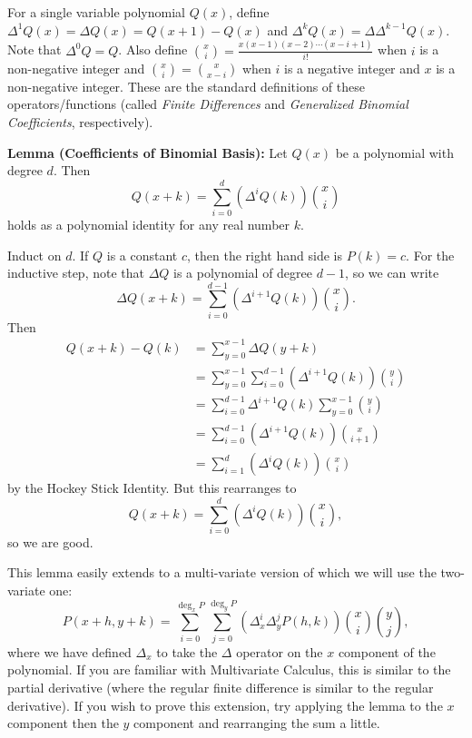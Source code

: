 For a single variable polynomial $Q\left(x\right)$, define $\Delta^1Q\left(x\right)=\Delta Q\left(x\right)=Q\left(x+1\right)-Q\left(x\right)$ and $\Delta^kQ\left(x\right)=\Delta\Delta^{k-1}Q\left(x\right)$. Note that $\Delta^0Q=Q$. Also define $\binom{x}{i}=\frac{x\left(x-1\right)\left(x-2\right)\cdots\left(x-i+1\right)}{i!}$ when $i$ is a non-negative integer and $\binom{x}{i}=\binom{x}{x-i}$ when $i$ is a negative integer and $x$ is a non-negative integer. These are the standard definitions of these operators/functions (called \emph{Finite Differences} and \emph{Generalized Binomial Coefficients}, respectively).

\textbf{Lemma (Coefficients of Binomial Basis):} Let $Q\left(x\right)$ be a polynomial with degree $d$. Then \[Q\left(x+k\right)=\displaystyle\sum_{i=0}^d\left(\Delta^iQ\left(k\right)\right)\binom{x}{i}\] holds as a polynomial identity for any real number $k$.

\begin{lemmaproof}
Induct on $d$. If $Q$ is a constant $c$, then the right hand side is $P\left(k\right)=c$. For the inductive step, note that $\Delta Q$ is a polynomial of degree $d-1$, so we can write \[\Delta Q\left(x+k\right)=\displaystyle\sum_{i=0}^{d-1}\left(\Delta^{i+1}Q\left(k\right)\right)\binom{x}{i}.\] Then \begin{align*}Q\left(x+k\right)-Q\left(k\right)&=\displaystyle\sum_{y=0}^{x-1}\Delta Q\left(y+k\right)\\&=\displaystyle\sum_{y=0}^{x-1}\displaystyle\sum_{i=0}^{d-1}\left(\Delta^{i+1}Q\left(k\right)\right)\binom{y}{i}\\&=\displaystyle\sum_{i=0}^{d-1}\Delta^{i+1}Q\left(k\right)\displaystyle\sum_{y=0}^{x-1}\binom{y}{i}\\&=\displaystyle\sum_{i=0}^{d-1}\left(\Delta^{i+1}Q\left(k\right)\right)\binom{x}{i+1}\\&=\displaystyle\sum_{i=1}^d\left(\Delta^iQ\left(k\right)\right)\binom{x}{i}\end{align*} by the Hockey Stick Identity. But this rearranges to \[Q\left(x+k\right)=\displaystyle\sum_{i=0}^d\left(\Delta^iQ\left(k\right)\right)\binom{x}{i},\] so we are good.
\end{lemmaproof}

This lemma easily extends to a multi-variate version of which we will use the two-variate one: \[P\left(x+h,y+k\right)=\displaystyle\sum_{i=0}^{\deg_xP}\displaystyle\sum_{j=0}^{\deg_yP}\left(\Delta_x^i\Delta_y^jP\left(h,k\right)\right)\binom{x}{i}\binom{y}{j},\] where we have defined $\Delta_x$ to take the $\Delta$ operator on the $x$ component of the polynomial. If you are familiar with Multivariate Calculus, this is similar to the partial derivative (where the regular finite difference is similar to the regular derivative). If you wish to prove this extension, try applying the lemma to the $x$ component then the $y$ component and rearranging the sum a little.

